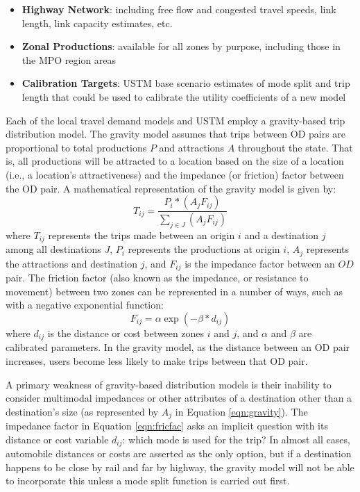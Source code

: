 \begin{itemize}
\item
  \textbf{Highway Network}: including free flow and congested travel speeds,
  link length, link capacity estimates, etc.
\item
  \textbf{Zonal Productions}: available for all zones by purpose,
  including those in the MPO region areas
\item
  \textbf{Calibration Targets}: USTM base scenario estimates of mode split and
  trip length that could be used to calibrate the utility coefficients of a new model
\end{itemize}

Each of the local travel demand models and USTM employ a gravity-based trip
distribution model. The gravity model assumes that trips between OD
pairs are proportional to total productions $P$ and
attractions $A$ throughout the state. That is, all productions will be
attracted to a location based on the size of a location (i.e., a location's
attractiveness) and the impedance (or friction) factor between the OD
pair. A mathematical representation of the gravity model is given by:
\begin{equation}
T_{ij}= \frac{P_i*(A_j F_{ij})}{\sum_{j\in J}(A_j F_{ij})}
 \label{eqn:gravity}
\end{equation}
\noindent where $T_{ij}$ represents the trips made between an origin $i$ and a
  destination $j$ among all destinations $J$, $P_i$ represents the productions at origin $i$, $A_j$ represents the attractions and destination $j$, and $F_{ij}$ is the impedance factor between an $OD$ pair.
The friction factor (also known as the impedance, or resistance to movement) between two
zones can be represented in a number of ways, such as with a negative
exponential function:
\begin{equation}
	F_{ij} = \alpha \exp(-\beta * d_{ij})
  \label{eqn:fricfac}
\end{equation}
\noindent where $d_{ij}$ is the distance or cost between zones $i$ and $j$, and $\alpha$
and $\beta$ are calibrated parameters. In the gravity model, as the distance
between an OD pair increases, users become less likely to make trips between
that OD pair.

A primary weakness of gravity-based distribution models is their inability to
consider multimodal impedances or other attributes of a destination other than
a destination's size (as represented by $A_j$ in Equation \ref{eqn:gravity}). The
impedance factor in Equation \ref{eqn:fricfac} asks an implicit question with its
distance or cost variable $d_{ij}$: which mode is used for the trip? In almost
all cases, automobile distances or costs are asserted as the only option, but if a
destination happens to be close by rail and far by highway, the gravity model
will not be able to incorporate this unless a mode split function is carried out first.


